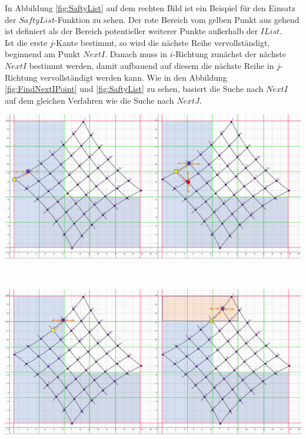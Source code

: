In Abbildung \ref{fig:SaftyList} auf dem rechten Bild ist ein Beispiel für den Einsatz der $SaftyList$-Funktion zu sehen. Der rote Bereich vom gelben Punkt aus gehend ist definiert als der Bereich potentieller weiterer Punkte außerhalb der $IList$.\\

Ist die erste $j$-Kante bestimmt, so wird die nächste Reihe vervollständigt, beginnend am Punkt $NextI$. Danach muss in $i$-Richtung zunächst der nächste $NextI$ bestimmt werden, damit aufbauend auf diesem die nächste Reihe in $j$-Richtung vervollständigt werden kann. Wie in den Abbildung \ref{fig:FindNextIPoint} und \ref{fig:SaftyList} zu sehen, basiert die Suche nach $NextI$ auf dem gleichen Verfahren wie die Suche nach $NextJ$.\\


\begin{minipage}{\linewidth}
	\centering
	\includegraphics[width=1\linewidth]{images/VerzeichnetesSchachbrett_5.png}
	\label{fig:FindNextIPoint}
\end{minipage}\\

\begin{minipage}{\linewidth}
	\centering
	\includegraphics[width=1\linewidth]{images/VerzeichnetesSchachbrett_6.png}
	\label{fig:SaftyList}
\end{minipage}\\

